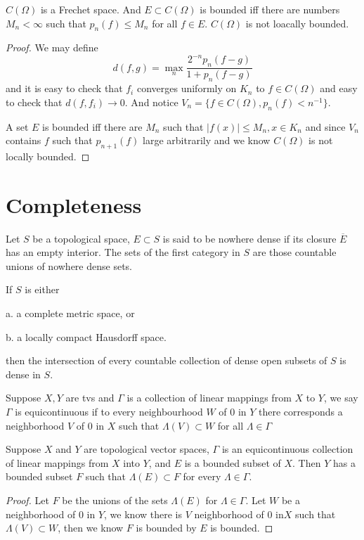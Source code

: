 \documentclass[lang=en, color=blue, ]{elegantbook}
\begin{document}
\begin{proposition}
    $C(\Omega)$ is a Frechet space. And $E \subset C(\Omega)$ is bounded iff there are numbers $M_n < \infty$ such that $p_n(f) \leq M_n$ for all $f\in E$. $C(\Omega)$ is not loacally bounded.
\end{proposition}
\begin{proof}
    We may define
    \[
    d(f,g) = \max_{n}\dfrac{2^{-n}p_n(f-g)}{1+p_n(f-g)}
    \]
    and it is easy to check that $f_i$ converges uniformly on $K_n$ to $f \in C(\Omega)$ and easy to check that $d(f,f_i) \to 0$. And notice $V_n = \{f\in C(\Omega), p_n(f) < n^{-1}\}$.\par
    A set $E$ is bounded iff there are $M_n$ such that $|f(x)| \leq M_n, x\in K_n$ and since $V_n$ contains $f$ such that $p_{n+1}(f)$ large arbitrarily and we know $C(\Omega)$ is not locally bounded.
\end{proof}

\chapter{Completeness}

\begin{definition}
    Let $S$ be a topological space, $E\subset S$ is said to be nowhere dense if its closure $\overline{E}$ has an empty interior. The sets of the first category in $S$ are those countable unions of nowhere dense sets.
\end{definition}

\begin{theorem}
    If $S$ is either\par
    a. a complete metric space, or\par
    b. a locally compact Hausdorff space.\par
    then the intersection of every countable collection of dense open subsets of $S$ is dense in $S$.
\end{theorem}

\begin{definition}
    Suppose $X,Y$ are tvs and $\Gamma$ is a collection of linear mappings from $X$ to $Y$, we say $\Gamma$ is equicontinuous if to every neighbourhood $W$ of $0$ in $Y$ there corresponds a neighborhood $V$ of $0$ in $X$ such that $\Lambda(V) \subset W$ for all $\Lambda\in \Gamma$
\end{definition}

\begin{theorem}
    Suppose $X$ and $Y$ are topological vector spaces, $\Gamma $ is an equicontinuous collection of linear mappings from $X$ into $Y$, and $E$ is a bounded subset of $X$. Then $Y$ has a bounded subset $F$ such that $\Lambda(E)\subset F$ for every $\Lambda \in \Gamma$.
\end{theorem}
\begin{proof}
    Let $F$ be the unions of the sets $\Lambda(E)$ for $\Lambda \in \Gamma$. Let $W$ be a neighborhood of $0$ in $Y$, we know there is $V$ neighborhood of $0$ in$X$ such that $\Lambda(V) \subset W$, then we know $F$ is bounded by $E$ is bounded.
\end{proof}
\end{document}
